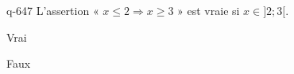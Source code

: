 \begin{truefalse}{q-647}
L'assertion « $x\leq 2 \Rightarrow x \geq 3$ » est vraie si  $x\in ]2;3[$.
\item* Vrai
\item Faux
\end{truefalse}

